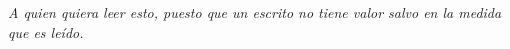 \hfill \textit{A quien quiera leer esto, puesto que un escrito no tiene valor salvo en la medida que es leído.}
